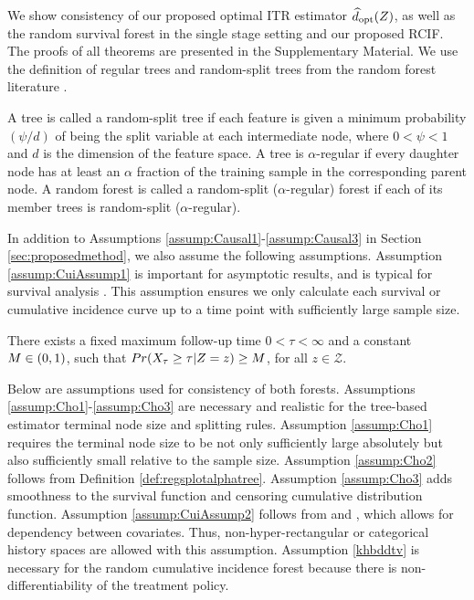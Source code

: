 We show consistency of our proposed optimal ITR estimator \( \widehat{d}_{\text{opt}}(Z) \), as well as the random survival forest in the single stage setting and our proposed RCIF. \prelim The proofs of all theorems are presented in the Supplementary Material. \fi We use the definition of regular trees and random-split trees from the random forest literature \citep{meinshausen_quantile_2006, wager_adaptive_2016, cui_consistency_2022}.
\begin{definition}
\label{def:regsplotalphatree}
A tree is called a random-split tree if each feature is given a minimum probability \( (\psi/d) \) of being the split variable at each intermediate node, where \( 0 < \psi < 1 \) and \( d \) is the dimension of the feature space. A tree is \( \alpha \)-regular if every daughter node has at least an \( \alpha \) fraction of the training sample in the corresponding parent node. A random forest is called a random-split (\( \alpha \)-regular) forest if each of its member trees is random-split (\( \alpha \)-regular).
\end{definition}

In addition to Assumptions \ref{assump:Causal1}-\ref{assump:Causal3} in Section \ref{sec:proposedmethod}, we also assume the following assumptions.
Assumption \ref{assump:CuiAssump1} is important for asymptotic results, and is typical for survival analysis \citep{fleming_counting_2011,cui_tree_2017}. This assumption ensures we only calculate each survival or cumulative incidence curve up to a time point with sufficiently large sample size.

\begin{assumption}
\label{assump:CuiAssump1}
There exists a fixed maximum follow-up time $0 < \tau < \infty$ and a constant $M \in (0, 1)$, such that $Pr(X_\tau \geq \tau | Z = z) \geq M$, for all $z \in \mathcal{Z}$.
\end{assumption}

Below are assumptions used for consistency of both forests. Assumptions \ref{assump:Cho1}-\ref{assump:Cho3} are necessary and realistic for the tree-based estimator terminal node size and splitting rules. Assumption \ref{assump:Cho1} requires the terminal node size to be not only sufficiently large absolutely but also sufficiently small relative to the sample size. Assumption \ref{assump:Cho2} follows from Definition \ref{def:regsplotalphatree}. Assumption \ref{assump:Cho3} adds smoothness to the survival function and censoring cumulative distribution function. Assumption \ref{assump:CuiAssump2} follows from \cite{cui_tree_2017} and \cite{wager_adaptive_2016}, which allows for dependency between covariates. Thus, non-hyper-rectangular or categorical history spaces are allowed with this assumption. Assumption \ref{khbddtv} is necessary for the random cumulative incidence forest because there is non-differentiability of the treatment policy.

